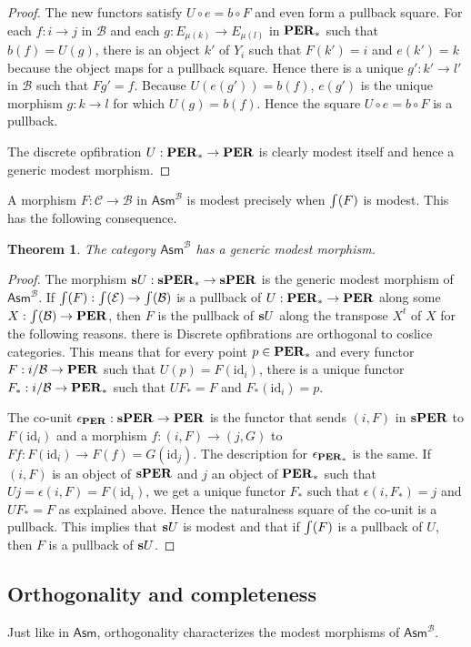 \documentclass{amsart}
\theoremstyle{plain}
\newtheorem{theorem}{Theorem}
\theoremstyle{definition}
\newcommand\cat\mathcal
\newcommand\id{\mathrm{id}}
\newcommand\Asm{\mathsf{Asm}}
\begin{document}
\begin{proof}
The new functors satisfy $U\circ e = b\circ F$ and even form a pullback square. For each $f:i\to j$ in $\cat B$ and each $g:E_{\mu(k)} \to E_{\mu(l)}$ in $\mathbf{PER}_*$ such that $b(f) = U(g)$, there is an object $k'$ of $Y_i$ such that $F(k') = i$ and $e(k') = k$ because the object maps for a pullback square. Hence there is a unique $g':k'\to l'$ in $\cat B$ such that $Fg' = f$. Because $U(e(g')) = b(f)$, $e(g')$ is the unique morphism $g:k\to l$ for which $U(g)=b(f)$. Hence the square $U\circ e = b\circ F$ is a pullback.

The discrete opfibration $U:\mathbf{PER}_*\to\mathbf{PER}$ is clearly modest itself and hence a generic modest morphism.
\end{proof}

A morphism $F:\cat C \to\cat B$ in $\Asm^\cat B$ is modest precisely when $\mathord{\int}(F)$ is modest. This has the following consequence.

\begin{theorem} The category $\Asm^\cat B$ has a generic modest morphism. \label{genmod} \end{theorem}

\begin{proof} The morphism $\mathbf{s} U:\mathbf{s}\mathbf{PER}_* \to\mathbf{s}\mathbf{PER}$ is the generic modest morphism of $\Asm^{\cat B}$. If $\tot(F):\tot(\cat E) \to \tot(\cat B)$ is a pullback of $U:\mathbf{PER}_*\to\mathbf{PER}$ along some $X:\tot(\cat B) \to \cat \pers$, then $F$ is the pullback of $\mathbf{s} U$ along the transpose $X^t$ of $X$ for the following reasons.
there is
Discrete opfibrations are orthogonal to coslice categories. This means that for every point $p\in \mathbf{PER}_*$ and every functor $F:i/\cat B\to\pers$ such that $U(p) = F(\id_i)$, there is a unique functor $F_*:i/\cat B\to\pers_*$ such that $UF_* = F$ and $F_*(\id_i) = p$.

The co-unit $\epsilon_{\mathbf{PER}}: \mathbf{s} \mathbf{PER} \to \mathbf{PER}$ is the functor that sends $(i,F)$ in $\mathbf{s} \mathbf{PER}$ to $F(\id_i)$ and a morphism $f:(i,F) \to (j,G)$ to $Ff:F(\id_i) \to F(f)=G(\id_j)$. The description for $\epsilon_{\mathbf{PER}_*}$ is the same. If $(i,F)$ is an object of $\mathbf{s} \mathbf{PER}$ and $j$ an object of $\mathbf{PER}_*$ such that $Uj = \epsilon(i,F) = F(\id_i)$, we get a unique functor $F_*$ such that $\epsilon(i,F_*) = j$ and $UF_* = F$ as explained above. Hence the naturalness square of the co-unit is a pullback. This implies that $\mathbf{s} U$ is modest and that if $\mathord{\int}(F)$ is a pullback of $U$, then $F$ is a pullback of $\mathbf{s} U$.
\end{proof}

\subsection{Orthogonality and completeness}
Just like in $\Asm$, orthogonality characterizes the modest morphisms of $\Asm^{\cat B}$. %
\end{document}
